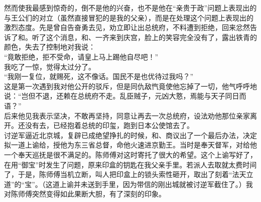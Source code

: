 然而使我最感到惊奇的，倒不是他的兴奋，也不是他在“亲贵于政”问题上表现出的与王公们的对立（虽然直接冒犯的是我的父亲），而是在处理这个问题上表现出的激烈态度。先是曾自告奋勇去见，劝立即让出总统府，不料遭到拒绝，回来忿然告诉了和。听了这个消息，和、一齐来到庆宫，脸上的笑容完全没有了，露出铁青的颜色，失去了控制地对我说：\\

“竟敢拒绝，拒不受命，请皇上马上踢他自尽吧！”\\

我吃了一惊，觉得太过分了。\\

“我刚一复位，就赐死，这不像话。国民不是也优待过我吗？”\\

这是第一次遇到我对他公开的驳斥，但是同仇敌忾竟使他忘掉了一切，他气呼呼地说：“岂但不退，还赖在总统府不走。乱臣贼子，元凶大憝，焉能与天子同日而语？”\\

后来他见我表示坚决，不敢再坚持，同意让再去一次总统府，设法劝他那位亲家离开。还没有去，已经抱着总统的印玺，跑到日本公使馆去了。\\

讨逆军逼近北京城，复辟已成绝望挣扎的时候，和、商议出了一个最后办法，决定拟一道上谕给，授他为东三省总督，命他火速进京勤王。当时是奉天督军，对给他一个奉天巡抚是很不满足的。陈师傅对这时寄托了很大的希望。这个上谕写好了，在用“御宝”时发生了问题，原来印盒的钥匙在我父亲手里。若派人去取就太费时间了，于是，陈师傅当机立断，叫人把印盒上的锁头索性砸开，取出了刻着“法天立道”的“宝”。（这道上谕并未送到手里，因为带信的刚出城就被讨逆军截住了。）我对陈师傅突然变得如此果断大胆，有了深刻的印象。\\

